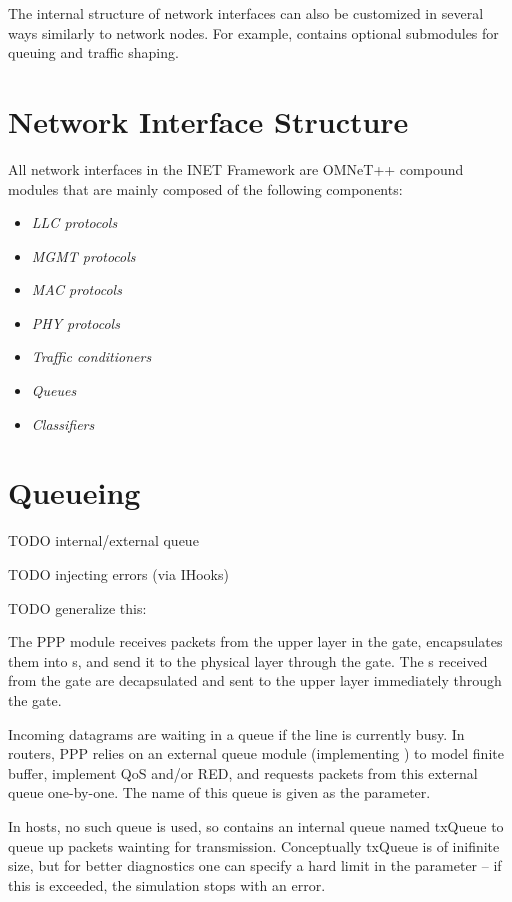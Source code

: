 The internal structure of network interfaces can also be customized in
several ways similarly to network nodes. For example,
 contains optional submodules for queuing and
traffic shaping.

\section{Network Interface Structure}

All network interfaces in the INET Framework are OMNeT++ compound modules that
are mainly composed of the following components:

\begin{itemize}
        \item \emph{LLC protocols}
        \item \emph{MGMT protocols}
        \item \emph{MAC protocols}
        \item \emph{PHY protocols}
        \item \emph{Traffic conditioners}
        \item \emph{Queues}
        \item \emph{Classifiers}
\end{itemize}

\section{Queueing}

TODO internal/external queue

TODO injecting errors (via IHooks)

TODO generalize this: 

The PPP module receives packets from the upper layer in the 
gate, encapsulates them into s, and send it to the
physical layer through the  gate. The s
received from the  gate are decapsulated and sent to the upper
layer immediately through the  gate.

Incoming datagrams are waiting in a queue if the line is currently busy.
In routers, PPP relies on an external queue module (implementing
) to model finite buffer, implement QoS and/or RED,
and requests packets from this external queue one-by-one. The name
of this queue is given as the  parameter.

In hosts, no such queue is used, so  contains an internal
queue named txQueue to queue up packets wainting for transmission.
Conceptually txQueue is of inifinite size, but for better diagnostics
one can specify a hard limit in the  parameter -- if
this is exceeded, the simulation stops with an error.

